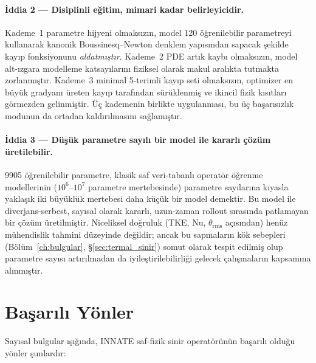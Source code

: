 \paragraph{İddia 2 --- Disiplinli eğitim, mimari kadar belirleyicidir.} Kademe~1 parametre hijyeni olmaksızın, model 120 öğrenilebilir parametreyi kullanarak kanonik Boussinesq--Newton denklem yapısından sapacak şekilde kayıp fonksiyonunu \emph{aldatmıştır}. Kademe~2 PDE artık kaybı olmaksızın, model alt-ızgara modelleme katsayılarını fiziksel olarak makul aralıkta tutmakta zorlanmıştır. Kademe~3 minimal 5-terimli kayıp seti olmaksızın, optimizer en büyük gradyanı üreten kayıp tarafından sürüklenmiş ve ikincil fizik kısıtları görmezden gelinmiştir. Üç kademenin birlikte uygulanması, bu üç başarısızlık modunun da ortadan kaldırılmasını sağlamıştır.

\paragraph{İddia 3 --- Düşük parametre sayılı bir model ile kararlı çözüm üretilebilir.} 9905 öğrenilebilir parametre, klasik saf veri-tabanlı operatör öğrenme modellerinin ($10^{6}$--$10^{7}$ parametre mertebesinde) parametre sayılarına kıyasla yaklaşık iki büyüklük mertebesi daha küçük bir model demektir. Bu model ile diverjans-serbest, sayısal olarak kararlı, uzun-zaman rollout sırasında patlamayan bir çözüm üretilmiştir. Niceliksel doğruluk (TKE, Nu, $\theta_{\mathrm{rms}}$ açısından) henüz mühendislik tahmini düzeyinde değildir; ancak bu sapmaların kök sebepleri (Bölüm~\ref{ch:bulgular}, §\ref{sec:termal_sinir}) somut olarak tespit edilmiş olup parametre sayısı artırılmadan da iyileştirilebilirliği gelecek çalışmaların kapsamına alınmıştır.

\section{Başarılı Yönler}

Sayısal bulgular ışığında, INNATE saf-fizik sinir operatörünün başarılı olduğu yönler şunlardır:

